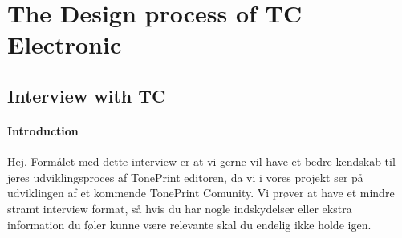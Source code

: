 \chapter{The Design process of TC Electronic}
\label{Interview}



\section{Interview with TC}
\label{InterviewInputs}

\subsubsection{Introduction}
Hej. Formålet med dette interview er at vi gerne vil have et bedre kendskab til jeres udviklingsproces af TonePrint editoren, da vi i vores projekt ser på udviklingen af et kommende TonePrint Comunity. Vi prøver at have et mindre stramt interview format, så hvis du har nogle indskydelser eller ekstra information du føler kunne være relevante skal du endelig ikke holde igen.\\


